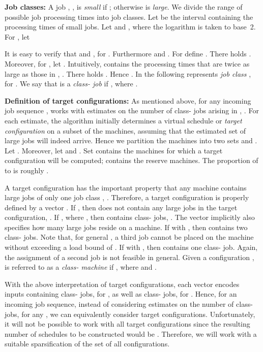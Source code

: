 \documentclass{llncs}
\begin{document}
{\bf Job classes:} A job , , is {\em small\/}
if ; otherwise  is {\em large\/}. We divide the range of possible job processing times
into job classes. Let  be the interval containing the processing times of small jobs.
Let  and , where the logarithm is
taken to base~2. For , let 

It is easy to verify that  and , for . Furthermore
 and . For  define
. There holds . Moreover, for 
, let . Intuitively,  contains the processing times that
are twice as large as those in , . There holds 
. Hence . In the following  represents {\em job class\/} , for . We say that
 is a {\em class- job\/} if , where .

{\bf Definition of target configurations:} As mentioned above, for any incoming job sequence , 
 works with estimates on the number of class- jobs arising in , . 
For each estimate, the algorithm initially determines a virtual schedule or {\em target configuration\/} on a 
subset of the machines, assuming that the estimated set of large jobs will indeed arrive. Hence we partition the 
 machines into two sets  and . Let . Moreover, 
let  and . Set  
contains the machines for which a target configuration will be computed;  contains the 
reserve machines. The proportion of   to   is roughly .

A target configuration has the important property that any machine  contains large jobs
of only one job class , . Therefore, a target configuration is properly defined
by a vector . If , then  does not contain 
any large jobs in the target configuration, . If  , where 
, then  contains class- jobs, . The vector  
implicitly also specifies how many large jobs reside on a machine. If  with , then
 contains two class- jobs. Note that, for general , a third job cannot be 
placed on the machine without exceeding a load bound of . If  with , then
 contains one class- job. Again, the assignment of a second job is not feasible in general. 
Given a configuration ,  is referred to as a {\em class- machine} if , where
 and . 

With the above interpretation of target configurations, each vector   encodes
inputs containing  class- jobs, for , as
well as   class- jobs, for .  Hence,
for an incoming job sequence, instead of considering estimates on the number of class- jobs, for any
, we can equivalently consider target configurations. Unfortunately, it
will not be possible to work with all target configurations  since the
resulting number of schedules to be constructed would be .
Therefore, we will work with a suitable sparsification of the set of all configurations.
\end{document}
